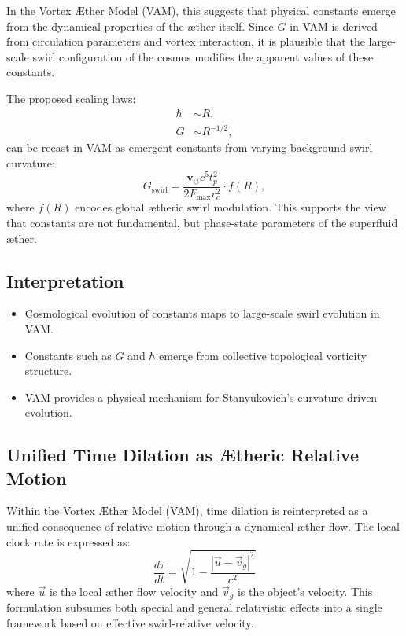 \documentclass[preprint]{revtex4-2}
\begin{document}
            In the Vortex \AE ther Model (VAM), this suggests that physical constants emerge from the dynamical properties of the æther itself. Since $G$ in VAM is derived from circulation parameters and vortex interaction, it is plausible that the large-scale swirl configuration of the cosmos modifies the apparent values of these constants.

            The proposed scaling laws:
            \begin{align*}
            \hbar &\sim R, \\
            G &\sim R^{-1/2},
            \end{align*}
            can be recast in VAM as emergent constants from varying background swirl curvature:
            \begin{equation}
            G_\text{swirl} = \frac{\mathbf{v}_{\scriptscriptstyle\boldsymbol{\circlearrowleft}} c^5 t_p^2}{2 F_\text{max} r_c^2} \cdot f(R),
            \end{equation}
            where $f(R)$ encodes global ætheric swirl modulation. This supports the view that constants are not fundamental, but phase-state parameters of the superfluid æther.

            \subsection*{Interpretation}
            \begin{itemize}
            \item Cosmological evolution of constants maps to large-scale swirl evolution in VAM.
            \item Constants such as $G$ and $\hbar$ emerge from collective topological vorticity structure.
            \item VAM provides a physical mechanism for Stanyukovich’s curvature-driven evolution.
            \end{itemize}

            \subsection*{Unified Time Dilation as Ætheric Relative Motion}
            Within the Vortex Æther Model (VAM), time dilation is reinterpreted as a unified consequence of relative motion through a dynamical æther flow. The local clock rate is expressed as:
            \[
                \frac{d\tau}{dt} = \sqrt{1 - \frac{|\vec{u} - \vec{v}_g|^2}{c^2}}
            \]
            where $\vec{u}$ is the local æther flow velocity and $\vec{v}_g$ is the object's velocity. This formulation subsumes both special and general relativistic effects into a single framework based on effective swirl-relative velocity.
\end{document}

